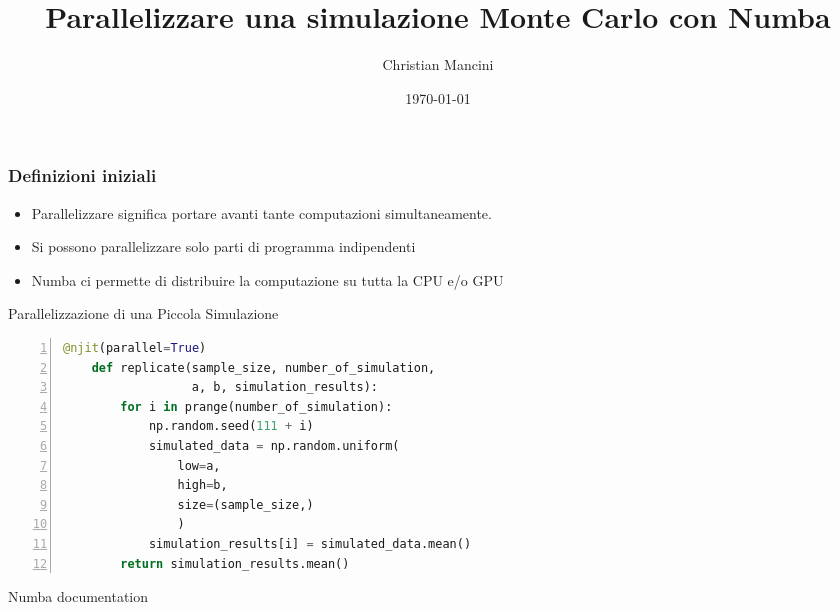 \documentclass{beamer}
\title{Parallelizzare una simulazione Monte Carlo con Numba}
\author{Christian Mancini}
\institute{Università degli studi di Firenze}
\date{\today}
\begin{document}
 \begin{frame}
    \titlepage
 \end{frame}

\begin{frame}
    \frametitle{Definizioni iniziali}
    \begin{itemize}
        \item Parallelizzare significa portare avanti tante computazioni simultaneamente.
        \item Si possono parallelizzare solo parti di programma indipendenti
        \item Numba ci permette di distribuire la computazione su tutta la CPU e/o GPU
    \end{itemize}
\end{frame}

\begin{frame}[fragile]{Parallelizzazione di una Piccola Simulazione}
    \begin{lstlisting}[language=Python, basicstyle=\ttfamily\scriptsize, keywordstyle=\color{blue}, commentstyle=\color{green!40!black}, numbers=left, numberstyle=\tiny, numbersep=5pt]
    @njit(parallel=True)
    def replicate(sample_size, number_of_simulation,
                  a, b, simulation_results):
        for i in prange(number_of_simulation):
            np.random.seed(111 + i)
            simulated_data = np.random.uniform(
                low=a,
                high=b,
                size=(sample_size,)
                )
            simulation_results[i] = simulated_data.mean()
        return simulation_results.mean()
    \end{lstlisting}
    \end{frame}
    

    








 \begin{frame}

    \begin{thebibliography}{10}
    \alert{Numba documentation}

    \end{thebibliography}

    \end{frame}


 
\end{document}
